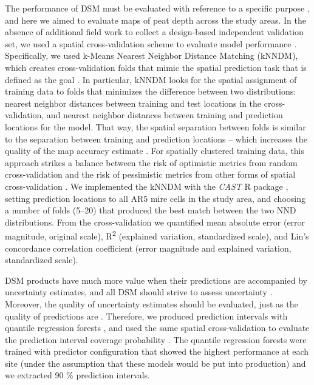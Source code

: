 \documentclass[soil, manuscript]{copernicus}
\begin{document}
The performance of DSM must be evaluated with reference to a specific purpose \citep[i.e., map vs.~model validation, interpolation vs.~extrapolation,][]{robertsCrossvalidationStrategiesData2017, milaNearestNeighbourDistance2022}, and here we aimed to evaluate maps of peat depth across the study areas.
In the absence of additional field work to collect a design-based independent validation set, we used a spatial cross-validation scheme to evaluate model performance \citep{wadouxSpatialCrossvalidationNot2021, meyerMachineLearningbasedGlobal2022}.
Specifically, we used k-Means Nearest Neighbor Distance Matching (kNNDM), which creates cross-validation folds that mimic the spatial prediction task that is defined as the goal \citep{linnenbrinkKNNDMCVKfold2024}.
In particular, kNNDM looks for the spatial assignment of training data to folds that minimizes the difference between two distributions: nearest neighbor distances between training and test locations in the cross-validation, and nearest neighbor distances between training and prediction locations for the model.
That way, the spatial separation between folds is similar to the separation between training and prediction locations -- which increases the quality of the map accuracy estimate \citep{linnenbrinkKNNDMCVKfold2024}.
For spatially clustered training data, this approach strikes a balance between the risk of optimistic metrics from random cross-validation and the risk of pessimistic metrics from other forms of spatial cross-validation \citep{wadouxSpatialCrossvalidationNot2021}.
We implemented the kNNDM with the \emph{CAST} R package \citep[v.1.0.2,][]{meyerCASTPackageTraining2024}, setting prediction locations to all AR5 mire cells in the study area, and choosing a number of folds (5--20) that produced the best match between the two NND distributions.
From the cross-validation we quantified mean absolute error (error magnitude, original scale), R\textsuperscript{2} (explained variation, standardized scale), and Lin's concordance correlation coefficient (error magnitude and explained variation, standardized scale).

DSM products have much more value when their predictions are accompanied by uncertainty estimates, and all DSM should strive to assess uncertainty \citep{arrouaysImpressionsDigitalSoil2020, wadouxMachineLearningDigital2020}.
Moreover, the quality of uncertainty estimates should be evaluated, just as the quality of predictions are \citep{heuvelinkSpatialStatisticsSoil2022}.
Therefore, we produced prediction intervals with quantile regression forests \citep{meinshausenQuantileRegressionForests2006}, and used the same spatial cross-validation to evaluate the prediction interval coverage probability \citep{shresthaMachineLearningApproaches2006}.
The quantile regression forests were trained with predictor configuration that showed the highest performance at each site (under the assumption that these models would be put into production) and we extracted 90 \% prediction intervals.
\end{document}
